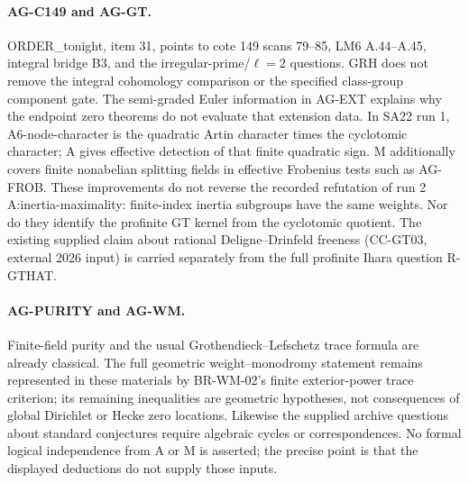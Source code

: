 \paragraph{AG-C149 and AG-GT.} ORDER\_tonight, item 31, points to cote
149 scans 79--85, LM6 A.44--A.45, integral bridge B3, and the
irregular-prime/$\ell=2$ questions. GRH does not remove the integral
cohomology comparison or the specified class-group component gate.
The semi-graded Euler information in AG-EXT explains why the endpoint
zero theorems do not evaluate that extension data. In SA22 run 1,
A6-node-character is the quadratic Artin character times the cyclotomic
character; A gives effective detection of that finite quadratic sign.
M additionally covers finite nonabelian splitting fields in effective
Frobenius tests such as AG-FROB. These improvements do not reverse the
recorded refutation of run 2 A:inertia-maximality: finite-index inertia
subgroups have the same weights. Nor do they identify the profinite GT
kernel from the cyclotomic quotient. The existing supplied claim about
rational Deligne--Drinfeld freeness (CC-GT03, external 2026 input) is
carried separately from the full profinite Ihara question R-GTHAT.

\paragraph{AG-PURITY and AG-WM.} Finite-field purity and the usual
Grothendieck--Lefschetz trace formula are already classical. The full
geometric weight--monodromy statement remains represented in these
materials by BR-WM-02's finite exterior-power trace criterion; its
remaining inequalities are geometric hypotheses, not consequences of
global Dirichlet or Hecke zero locations. Likewise the supplied archive
questions about standard conjectures require algebraic cycles or
correspondences. No formal logical independence from A or M is asserted;
the precise point is that the displayed deductions do not supply those
inputs.
